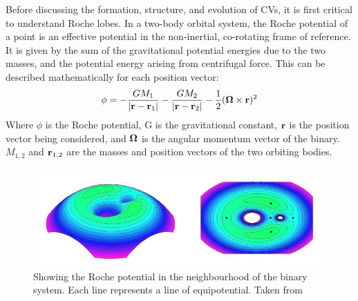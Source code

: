 Before discussing the formation, structure, and evolution of CVs, it is first critical to understand Roche lobes.
In a two-body orbital system, the Roche potential of a point is an effective potential in the non-inertial, co-rotating frame of reference. It is given by the sum of the gravitational potential energies due to the two masses, and the potential energy arising from centrifugal force. This can be described mathematically for each position vector:
\begin{equation}
    {\bf \phi} = -\frac{G M_1}{|{\bf r - r}_1|} - \frac{G M_2}{|{\bf r - r}_2|} - \frac{1}{2}({\bf \Omega} \times {\bf r})^2
\end{equation}
Where $\phi$ is the Roche potential, G is the gravitational constant, $\bf r$ is the position vector being considered, and $\bf \Omega$ is the angular momentum vector of the binary. $M_{1,2}$ and ${\bf r}_{1,2}$ are the masses and position vectors of the two orbiting bodies.

\begin{figure}
    \centering
    \includegraphics[width=\columnwidth, trim={0mm 0mm 380px 0mm}, clip]{figures/introduction/roche.png}
    \caption{Showing the Roche potential in the neighbourhood of the binary system. Each line represents a line of equipotential. Taken from \citet{cerutti2007}}
    \label{fig:roche}
\end{figure}

